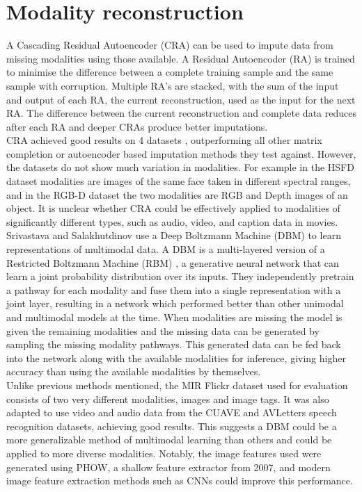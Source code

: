 \section{Modality reconstruction}
A Cascading Residual Autoencoder (CRA) \cite{CRA} can be used to impute data from missing modalities using those available. A Residual Autoencoder (RA) is trained to minimise the difference between a complete training sample and the same sample with corruption. Multiple RA’s are stacked, with the sum of the input and output of each RA, the current reconstruction, used as the input for the next RA. The difference between the current reconstruction and complete data reduces after each RA and deeper CRAs produce better imputations.\\

CRA achieved good results on 4 datasets \cite{CRA}, outperforming all other matrix completion or autoencoder based imputation methods they test against. However, the datasets do not show much variation in modalities. For example in the HSFD dataset modalities are images of the same face taken in different spectral ranges, and in the RGB-D dataset the two modalities are RGB and Depth images of an object. It is unclear whether CRA could be effectively applied to modalities of significantly different types, such as audio, video, and caption data in movies.\\

Srivastava and Salakhutdinov \cite{DBM} use a Deep Boltzmann Machine (DBM) to learn representations of multimodal data. A DBM is a multi-layered version of a Restricted Boltzmann Machine (RBM) \cite{RBM}, a generative neural network that can learn a joint probability distribution over its inputs. They independently pretrain a pathway for each modality and fuse them into a single representation with a joint layer, resulting in a network which performed better than other unimodal and multimodal models at the time. When modalities are missing the model is given the remaining modalities and the missing data can be generated by sampling the missing modality pathways. This generated data can be fed back into the network along with the available modalities for inference, giving higher accuracy than using the available modalities by themselves.\\

Unlike previous methods mentioned, the MIR Flickr dataset used for evaluation consists of two very different modalities, images and image tags. It was also adapted to use video and audio data from the CUAVE and AVLetters speech recognition datasets, achieving good results. This suggests a DBM could be a more generalizable method of multimodal learning than others and could be applied to more diverse modalities. Notably, the image features used were generated using PHOW, a shallow feature extractor from 2007, and modern image feature extraction methods such as CNNs could improve this performance.\\

